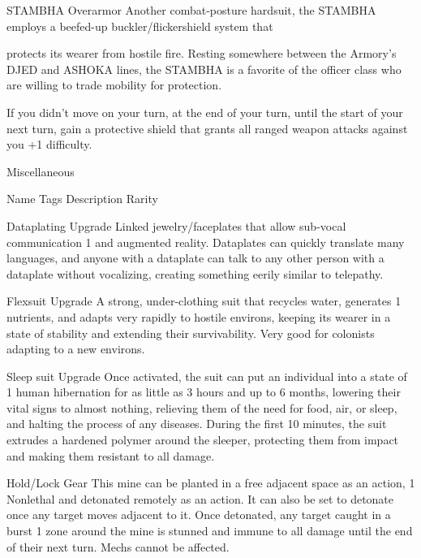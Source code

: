 STAMBHA Overarmor
Another combat-posture hardsuit, the STAMBHA employs a beefed-up buckler/flickershield system that

protects its wearer from hostile fire. Resting somewhere between the Armory’s DJED and ASHOKA lines,
the STAMBHA is a favorite of the officer class who are willing to trade mobility for protection.

If you didn’t move on your turn, at the end of your turn, until the start of your next turn, gain a protective
shield that grants all ranged weapon attacks against you +1 difficulty.


                                                   Miscellaneous

  Name                Tags         Description                                                               Rarity

 Dataplating          Upgrade      Linked jewelry/faceplates that allow sub-vocal communication               1
                                   and augmented reality. Dataplates can quickly translate many
                                   languages, and anyone with a dataplate can talk to any other
                                   person with a dataplate without vocalizing, creating something
                                   eerily similar to telepathy.

 Flexsuit             Upgrade      A strong, under-clothing suit that recycles water, generates               1
                                   nutrients, and adapts very rapidly to hostile environs, keeping its
                                   wearer in a state of stability and extending their survivability. Very
                                   good for colonists adapting to a new environs.

 Sleep suit           Upgrade      Once activated, the suit can put an individual into a state of             1
                                   human hibernation for as little as 3 hours and up to 6 months,
                                   lowering their vital signs to almost nothing, relieving them of the
                                   need for food, air, or sleep, and halting the process of any
                                   diseases. During the first 10 minutes, the suit extrudes a
                                   hardened polymer around the sleeper, protecting them from
                                   impact and making them resistant to all damage.




 Hold/Lock          Gear        This mine can be planted in a free adjacent space as an action,      1
 Nonlethal                      and detonated remotely as an action. It can also be set to
                                detonate once any target moves adjacent to it. Once detonated,
                                any target caught in a burst 1 zone around the mine is stunned
                                and immune to all damage until the end of their next turn. Mechs
                                cannot be affected.

